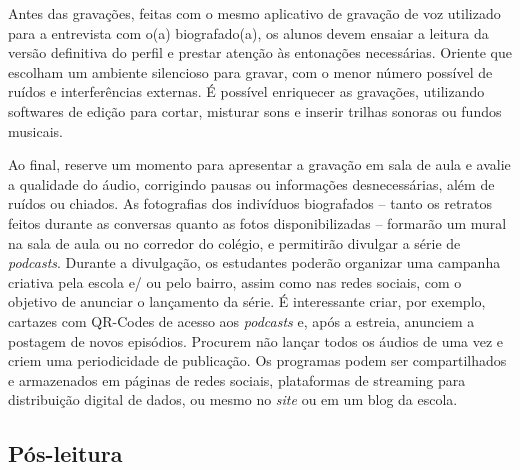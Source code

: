 \documentclass[11pt]{extarticle}
\begin{document}
Antes das gravações, feitas com o mesmo aplicativo de gravação de voz
utilizado para a entrevista com o(a) biografado(a), os alunos devem
ensaiar a leitura da versão definitiva do perfil e prestar atenção às
entonações necessárias. Oriente que escolham um ambiente silencioso para
gravar, com o menor número possível de ruídos e interferências externas.
É possível enriquecer as gravações, utilizando softwares de edição para
cortar, misturar sons e inserir trilhas sonoras ou fundos musicais.

Ao final, reserve um momento para apresentar a gravação em sala de aula
e avalie a qualidade do áudio, corrigindo pausas ou informações
desnecessárias, além de ruídos ou chiados. As fotografias dos indivíduos
biografados -- tanto os retratos feitos durante as conversas quanto as
fotos disponibilizadas -- formarão um mural na sala de aula ou no
corredor do colégio, e permitirão divulgar a série de \emph{podcasts}.
Durante a divulgação, os estudantes poderão organizar uma campanha
criativa pela escola e/ ou pelo bairro, assim como nas redes sociais,
com o objetivo de anunciar o lançamento da série. É interessante criar,
por exemplo, cartazes com QR-Codes de acesso aos \emph{podcasts} e, após
a estreia, anunciem a postagem de novos episódios. Procurem não lançar
todos os áudios de uma vez e criem uma periodicidade de publicação. Os
programas podem ser compartilhados e armazenados em páginas de redes
sociais, plataformas de streaming para distribuição digital de dados, ou
mesmo no \emph{site} ou em um blog da escola.

\subsection{Pós-leitura}


\end{document}

